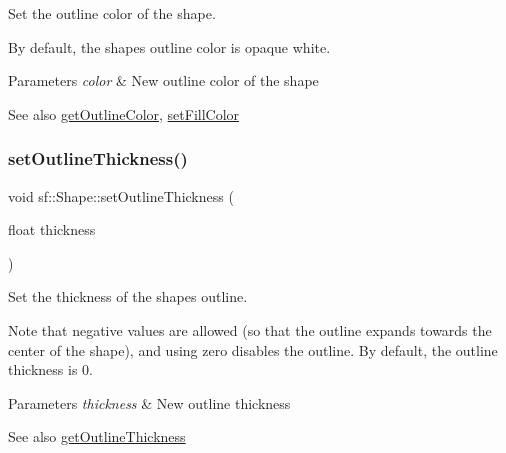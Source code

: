 Set the outline color of the shape. 

By default, the shape\textquotesingle{}s outline color is opaque white.


\begin{DoxyParams}{Parameters}
{\em color} & New outline color of the shape\\
\hline
\end{DoxyParams}
\begin{DoxySeeAlso}{See also}
\mbox{\hyperlink{classsf_1_1_shape_a6598feed5fea1325a36b0f3a615ac55c}{get\+Outline\+Color}}, \mbox{\hyperlink{classsf_1_1_shape_a3506f9b5d916fec14d583d16f23c2485}{set\+Fill\+Color}} \begin{DoxyVerb}\end{DoxyVerb}
 
\end{DoxySeeAlso}
\mbox{\label{classsf_1_1_shape_a5ad336ad74fc1f567fce3b7e44cf87dc}} 
\subsubsection{\texorpdfstring{setOutlineThickness()}{setOutlineThickness()}}
{\footnotesize\ttfamily void sf\+::\+Shape\+::set\+Outline\+Thickness (\begin{DoxyParamCaption}\item[{float}]{thickness }\end{DoxyParamCaption})}



Set the thickness of the shape\textquotesingle{}s outline. 

Note that negative values are allowed (so that the outline expands towards the center of the shape), and using zero disables the outline. By default, the outline thickness is 0.


\begin{DoxyParams}{Parameters}
{\em thickness} & New outline thickness\\
\hline
\end{DoxyParams}
\begin{DoxySeeAlso}{See also}
\mbox{\hyperlink{classsf_1_1_shape_a1d4d5299c573a905e5833fc4dce783a7}{get\+Outline\+Thickness}} \begin{DoxyVerb}\end{DoxyVerb}
 
\end{DoxySeeAlso}
\mbox{\label{classsf_1_1_shape_af8fb22bab1956325be5d62282711e3b6}} 
